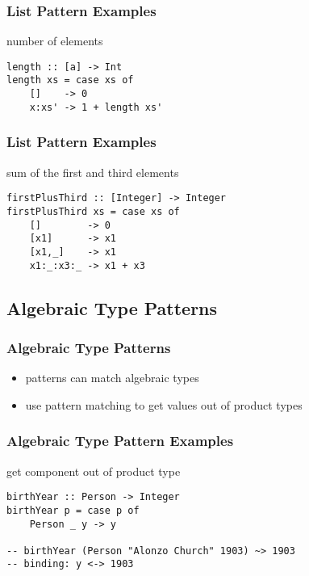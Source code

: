 \documentclass[dvipsnames]{beamer}
\theoremstyle{plain}
\begin{document}
\begin{frame}[fragile]
  \frametitle{List Pattern Examples}

  \begin{exampleblock}{number of elements}
    \begin{lstlisting}[deletekeywords={length}]
length :: [a] -> Int
length xs = case xs of
    []    -> 0
    x:xs' -> 1 + length xs'
    \end{lstlisting}
  \end{exampleblock}
\end{frame}

\begin{frame}[fragile]
  \frametitle{List Pattern Examples}

  \begin{exampleblock}{sum of the first and third elements}
    \begin{lstlisting}
firstPlusThird :: [Integer] -> Integer
firstPlusThird xs = case xs of
    []        -> 0
    [x1]      -> x1
    [x1,_]    -> x1
    x1:_:x3:_ -> x1 + x3
    \end{lstlisting}
  \end{exampleblock}
\end{frame}

\subsection{Algebraic Type Patterns}

\begin{frame}
  \frametitle{Algebraic Type Patterns}

  \begin{itemize}
    \item patterns can match algebraic types
    \item use pattern matching to get values out of product types
  \end{itemize}
\end{frame}

\begin{frame}[fragile]
  \frametitle{Algebraic Type Pattern Examples}

  \begin{exampleblock}{get component out of product type}
    \begin{lstlisting}
birthYear :: Person -> Integer
birthYear p = case p of
    Person _ y -> y

-- birthYear (Person "Alonzo Church" 1903) ~> 1903
-- binding: y <-> 1903
    \end{lstlisting}
  \end{exampleblock}
\end{frame}
\end{document}
